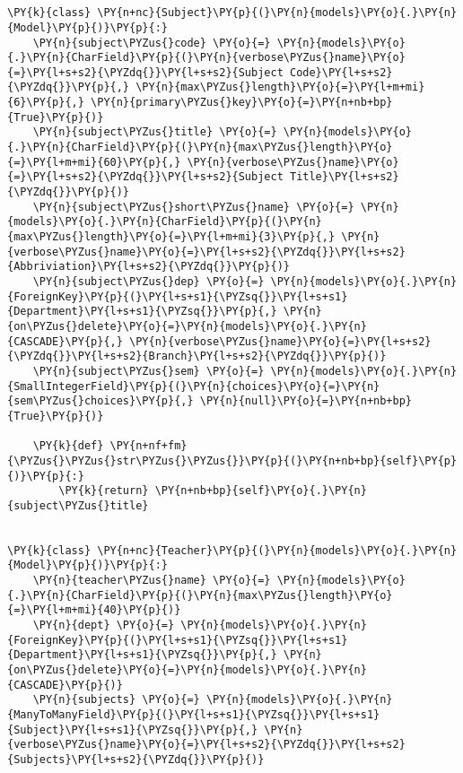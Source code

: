 \section*{}

\begin{Verbatim}[commandchars=\\\{\}]
 \PY{k}{class} \PY{n+nc}{Subject}\PY{p}{(}\PY{n}{models}\PY{o}{.}\PY{n}{Model}\PY{p}{)}\PY{p}{:}
    \PY{n}{subject\PYZus{}code} \PY{o}{=} \PY{n}{models}\PY{o}{.}\PY{n}{CharField}\PY{p}{(}\PY{n}{verbose\PYZus{}name}\PY{o}{=}\PY{l+s+s2}{\PYZdq{}}\PY{l+s+s2}{Subject Code}\PY{l+s+s2}{\PYZdq{}}\PY{p}{,} \PY{n}{max\PYZus{}length}\PY{o}{=}\PY{l+m+mi}{6}\PY{p}{,} \PY{n}{primary\PYZus{}key}\PY{o}{=}\PY{n+nb+bp}{True}\PY{p}{)}
    \PY{n}{subject\PYZus{}title} \PY{o}{=} \PY{n}{models}\PY{o}{.}\PY{n}{CharField}\PY{p}{(}\PY{n}{max\PYZus{}length}\PY{o}{=}\PY{l+m+mi}{60}\PY{p}{,} \PY{n}{verbose\PYZus{}name}\PY{o}{=}\PY{l+s+s2}{\PYZdq{}}\PY{l+s+s2}{Subject Title}\PY{l+s+s2}{\PYZdq{}}\PY{p}{)}
    \PY{n}{subject\PYZus{}short\PYZus{}name} \PY{o}{=} \PY{n}{models}\PY{o}{.}\PY{n}{CharField}\PY{p}{(}\PY{n}{max\PYZus{}length}\PY{o}{=}\PY{l+m+mi}{3}\PY{p}{,} \PY{n}{verbose\PYZus{}name}\PY{o}{=}\PY{l+s+s2}{\PYZdq{}}\PY{l+s+s2}{Abbriviation}\PY{l+s+s2}{\PYZdq{}}\PY{p}{)}
    \PY{n}{subject\PYZus{}dep} \PY{o}{=} \PY{n}{models}\PY{o}{.}\PY{n}{ForeignKey}\PY{p}{(}\PY{l+s+s1}{\PYZsq{}}\PY{l+s+s1}{Department}\PY{l+s+s1}{\PYZsq{}}\PY{p}{,} \PY{n}{on\PYZus{}delete}\PY{o}{=}\PY{n}{models}\PY{o}{.}\PY{n}{CASCADE}\PY{p}{,} \PY{n}{verbose\PYZus{}name}\PY{o}{=}\PY{l+s+s2}{\PYZdq{}}\PY{l+s+s2}{Branch}\PY{l+s+s2}{\PYZdq{}}\PY{p}{)}
    \PY{n}{subject\PYZus{}sem} \PY{o}{=} \PY{n}{models}\PY{o}{.}\PY{n}{SmallIntegerField}\PY{p}{(}\PY{n}{choices}\PY{o}{=}\PY{n}{sem\PYZus{}choices}\PY{p}{,} \PY{n}{null}\PY{o}{=}\PY{n+nb+bp}{True}\PY{p}{)}

    \PY{k}{def} \PY{n+nf+fm}{\PYZus{}\PYZus{}str\PYZus{}\PYZus{}}\PY{p}{(}\PY{n+nb+bp}{self}\PY{p}{)}\PY{p}{:}
        \PY{k}{return} \PY{n+nb+bp}{self}\PY{o}{.}\PY{n}{subject\PYZus{}title}


\PY{k}{class} \PY{n+nc}{Teacher}\PY{p}{(}\PY{n}{models}\PY{o}{.}\PY{n}{Model}\PY{p}{)}\PY{p}{:}
    \PY{n}{teacher\PYZus{}name} \PY{o}{=} \PY{n}{models}\PY{o}{.}\PY{n}{CharField}\PY{p}{(}\PY{n}{max\PYZus{}length}\PY{o}{=}\PY{l+m+mi}{40}\PY{p}{)}
    \PY{n}{dept} \PY{o}{=} \PY{n}{models}\PY{o}{.}\PY{n}{ForeignKey}\PY{p}{(}\PY{l+s+s1}{\PYZsq{}}\PY{l+s+s1}{Department}\PY{l+s+s1}{\PYZsq{}}\PY{p}{,} \PY{n}{on\PYZus{}delete}\PY{o}{=}\PY{n}{models}\PY{o}{.}\PY{n}{CASCADE}\PY{p}{)}
    \PY{n}{subjects} \PY{o}{=} \PY{n}{models}\PY{o}{.}\PY{n}{ManyToManyField}\PY{p}{(}\PY{l+s+s1}{\PYZsq{}}\PY{l+s+s1}{Subject}\PY{l+s+s1}{\PYZsq{}}\PY{p}{,} \PY{n}{verbose\PYZus{}name}\PY{o}{=}\PY{l+s+s2}{\PYZdq{}}\PY{l+s+s2}{Subjects}\PY{l+s+s2}{\PYZdq{}}\PY{p}{)}


\end{Verbatim}
